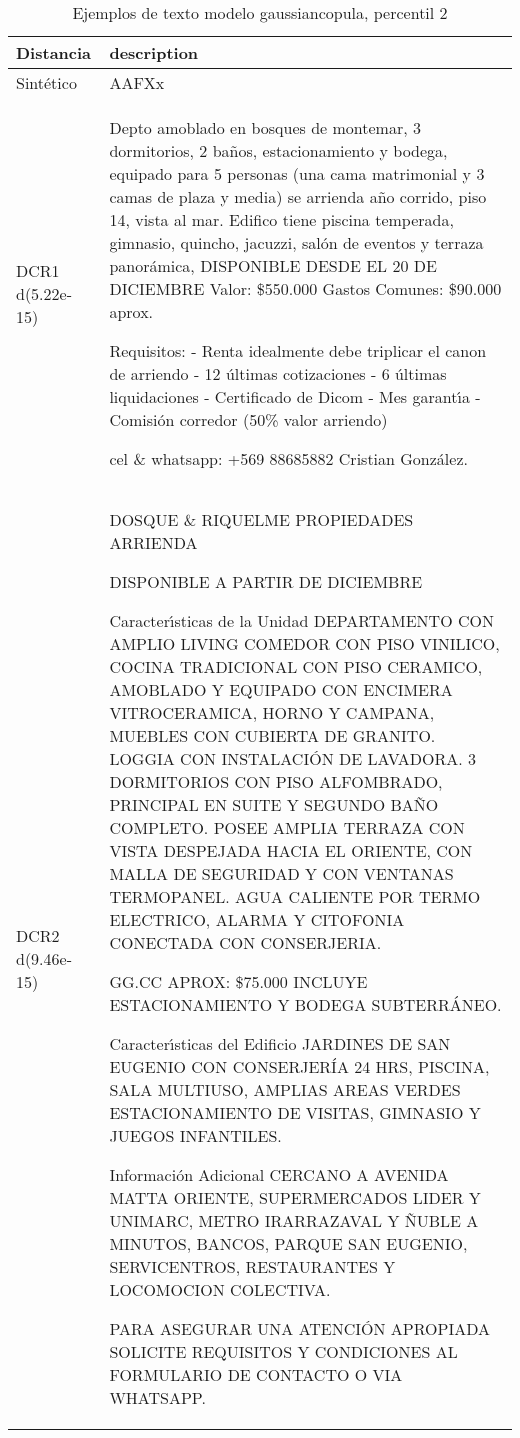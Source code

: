 \begin{table}[H]
\centering
\fontsize{10}{14}\selectfont
\caption{Ejemplos de texto modelo gaussiancopula, percentil 2}
\label{table-example-economicos-b-1-gaussiancopula-2p-text}
\begin{tabular}{|l|m{35em}|}
\hline
\rowcolor[gray]{0.8}
Distancia & description \\
\hline Sintético & AAFXx \\
\hline DCR1 d(5.22e-15) & Depto amoblado en bosques de montemar, 3 dormitorios, 2 ba\~nos, estacionamiento y bodega, equipado para 5 personas (una cama matrimonial y 3 camas de plaza y media) se arrienda a\~no corrido, piso 14, vista al mar.
Edifico tiene piscina temperada, gimnasio, quincho, jacuzzi, sal\'on de eventos y terraza panor\'amica, 
DISPONIBLE DESDE EL 20 DE DICIEMBRE
Valor: \$550.000
Gastos Comunes: \$90.000 aprox.

Requisitos:
- Renta idealmente debe triplicar el canon de arriendo 
- 12 \'ultimas cotizaciones
- 6 \'ultimas liquidaciones
- Certificado de Dicom
- Mes garant{\'\i}a
- Comisi\'on corredor (50\% valor arriendo)

cel \& whatsapp: +569 88685882
Cristian Gonz\'alez.
 \\
\hline DCR2 d(9.46e-15) & DOSQUE \& RIQUELME PROPIEDADES ARRIENDA

DISPONIBLE A PARTIR DE DICIEMBRE

Caracter{\'\i}sticas de la Unidad
DEPARTAMENTO CON AMPLIO LIVING COMEDOR CON PISO VINILICO, COCINA TRADICIONAL CON PISO CERAMICO, AMOBLADO Y EQUIPADO CON ENCIMERA VITROCERAMICA, HORNO Y CAMPANA, MUEBLES CON CUBIERTA DE GRANITO. LOGGIA CON INSTALACI\'ON DE LAVADORA. 3 DORMITORIOS CON PISO ALFOMBRADO, PRINCIPAL EN SUITE Y SEGUNDO BA\~NO COMPLETO. POSEE AMPLIA TERRAZA CON VISTA DESPEJADA HACIA EL ORIENTE, CON MALLA DE SEGURIDAD Y CON VENTANAS TERMOPANEL. AGUA CALIENTE POR TERMO ELECTRICO, ALARMA Y CITOFONIA CONECTADA CON CONSERJERIA.

GG.CC APROX: \$75.000
INCLUYE ESTACIONAMIENTO Y BODEGA SUBTERR\'ANEO.

Caracter{\'\i}sticas del Edificio
JARDINES DE SAN EUGENIO CON CONSERJER\'IA 24 HRS, PISCINA, SALA MULTIUSO, AMPLIAS AREAS VERDES ESTACIONAMIENTO DE VISITAS, GIMNASIO Y JUEGOS INFANTILES.

Informaci\'on Adicional
CERCANO A AVENIDA MATTA ORIENTE, SUPERMERCADOS LIDER Y UNIMARC, METRO IRARRAZAVAL Y \~NUBLE A MINUTOS, BANCOS, PARQUE SAN EUGENIO, SERVICENTROS, RESTAURANTES Y LOCOMOCION COLECTIVA.

PARA ASEGURAR UNA ATENCI\'ON APROPIADA SOLICITE REQUISITOS Y CONDICIONES AL FORMULARIO DE CONTACTO O VIA WHATSAPP.  
 \\
\hline
\end{tabular}
\end{table}
